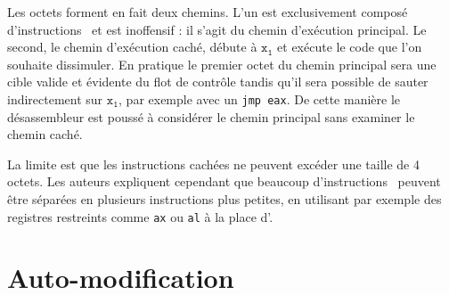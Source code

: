 Les octets forment en fait deux chemins. L'un est exclusivement composé d'instructions \nop\ et est inoffensif : il s'agit du chemin d'exécution principal. Le second, le chemin d'exécution caché, débute à $\mathtt{x_1}$ et exécute le code que l'on souhaite dissimuler. En pratique le premier octet du chemin principal sera une cible valide et évidente du flot de contrôle tandis qu'il sera possible de sauter indirectement sur $\mathtt{x_1}$, par exemple avec un \texttt{jmp eax}. De cette manière le désassembleur est poussé à considérer le chemin principal sans examiner le chemin caché.

La limite est que les instructions cachées ne peuvent excéder une taille de 4 octets. Les auteurs expliquent cependant que beaucoup d'instructions \xq\ peuvent être séparées en plusieurs instructions plus petites, en utilisant par exemple des registres restreints comme \texttt{ax} ou \texttt{al} à la place d'\eax.

\section{Auto-modification}


